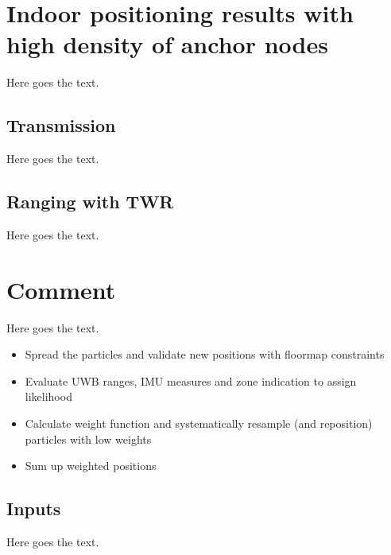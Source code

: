 
\section{Indoor positioning results with high density of anchor nodes}
Here goes the text.

\subsection{Transmission}
Here goes the text.
\subsection{Ranging with TWR}
Here goes the text.


\section{Comment}
Here goes the text.
\begin{itemize}
\item Spread the particles and validate new positions with floormap constraints
\item Evaluate UWB ranges, IMU measures and zone indication to assign likelihood
\item Calculate weight function and systematically resample (and reposition) particles with low weights
\item Sum up weighted positions
\end{itemize}

\subsection{Inputs}
Here goes the text.



